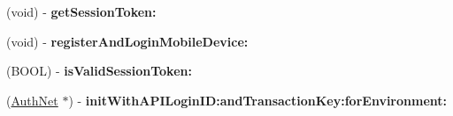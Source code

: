 \begin{DoxyCompactItemize}
\item 
\hypertarget{interface_auth_net_a815830cb4b7f723df3295bc2400c48d3}{
(void) -\/ {\bfseries getSessionToken:}}
\label{interface_auth_net_a815830cb4b7f723df3295bc2400c48d3}

\item 
\hypertarget{interface_auth_net_a131213e8b41e8708e48003f5d9b7d347}{
(void) -\/ {\bfseries registerAndLoginMobileDevice:}}
\label{interface_auth_net_a131213e8b41e8708e48003f5d9b7d347}

\item 
\hypertarget{interface_auth_net_a6df683d722015e3faa84be18eb536081}{
(BOOL) -\/ {\bfseries isValidSessionToken:}}
\label{interface_auth_net_a6df683d722015e3faa84be18eb536081}

\item 
\hypertarget{interface_auth_net_a1175fb170e583b5fb9835e0d1b9081db}{
(\hyperlink{interface_auth_net}{AuthNet} $\ast$) -\/ {\bfseries initWithAPILoginID:andTransactionKey:forEnvironment:}}
\label{interface_auth_net_a1175fb170e583b5fb9835e0d1b9081db}

\end{DoxyCompactItemize}
